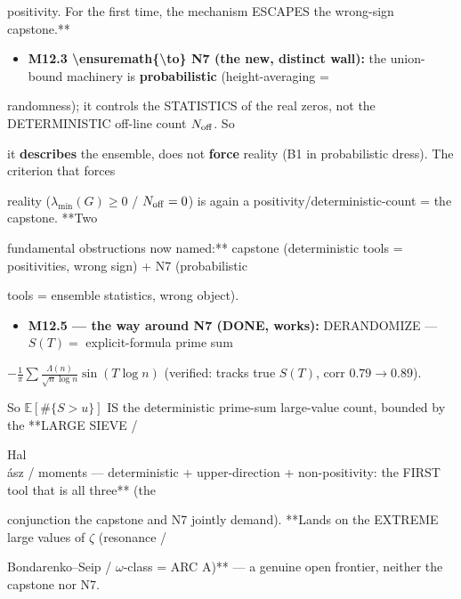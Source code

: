 \documentclass[10pt]{article}
\begin{document}
  positivity.\textbf{ }For the first time, the mechanism ESCAPES the wrong-sign capstone.**\par
\begin{itemize}
\item \textbf{M12.3 \textbackslash{}ensuremath\{\textbackslash{}to\} N7 (the new, distinct wall):} the union-bound machinery is \textbf{probabilistic} (height-averaging =
\end{itemize}
  randomness); it controls the STATISTICS of the real zeros, not the DETERMINISTIC off-line count $N_{\rm off}$. So\par
  it \textbf{describes} the ensemble, does not \textbf{force} reality (B1 in probabilistic dress). The criterion that forces\par
  reality ($\lambda_{\min}(G)\ge0$ / $N_{\rm off}=0$) is again a positivity/deterministic-count = the capstone. **Two\par
  fundamental obstructions now named:** capstone (deterministic tools = positivities, wrong sign) + N7 (probabilistic\par
  tools = ensemble statistics, wrong object).\par
\begin{itemize}
\item \textbf{M12.5 --- the way around N7 (DONE, works):} DERANDOMIZE --- $S(T)=$ explicit-formula prime sum
\end{itemize}
  $-\frac1\pi\sum\frac{\Lambda(n)}{\sqrt n\log n}\sin(T\log n)$ (verified: tracks true $S(T)$, corr $0.79\to0.89$).\par
  So $\mathbb E[\#\{S>u\}]$ IS the deterministic prime-sum large-value count, bounded by the **LARGE SIEVE /\par
  Hal\\\'asz / moments --- deterministic + upper-direction + non-positivity: the FIRST tool that is all three** (the\par
  conjunction the capstone and N7 jointly demand). **Lands on the EXTREME large values of \ensuremath{\zeta} (resonance /\par
  Bondarenko--Seip / \ensuremath{\omega}-class = ARC A)** --- a genuine open frontier, neither the capstone nor N7.\par
\end{document}
